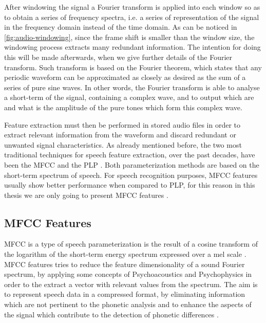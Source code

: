 After windowing the signal a Fourier transform is applied into each window so as to obtain
a series of frequency spectra, i.e. a series of representation of the signal in the frequency domain instead of the time domain. As can be noticed in \autoref{fig:audio-windowing}, since the frame shift is smaller than the window size, the windowing process extracts many redundant information. The intention for doing this will be made afterwards, when we give further details of the Fourier transform. Such transform is based on the Fourier theorem, which states that any periodic waveform can be approximated as closely as desired as the sum of a series of pure sine waves. In other words, the Fourier transform is able to analyse a short-term of the signal, containing a complex wave, and to output which are and what is the amplitude of the pure tones which form this complex wave.

Feature extraction must then be performed in stored audio files in order to extract relevant information from the waveform and discard redundant or unwanted signal characteristics. As already mentioned before, the two most traditional techniques for speech feature extraction, over the past decades, have been the \ac{MFCC} \cite{Davis1980} and the \ac{PLP} \cite{Hermansky1990}. Both parameterization methods are based on the short-term spectrum of speech. For speech recognition purposes, \ac{MFCC} features usually show better performance when compared to \ac{PLP}, for this reason in this thesis we are only going to present \ac{MFCC} features \cite{Muller2001, Mporas2007}.

\subsection{MFCC Features}

\ac{MFCC} is a type of speech parameterization is the result of a cosine transform of the logarithm of the short-term energy spectrum expressed over a mel scale \cite{Davis1980}. \ac{MFCC} features tries to reduce the feature dimensionality of a sound Fourier spectrum, by applying some concepts of Psychoacoustics and Psychophysics in order to the extract a vector with relevant values from the spectrum. The aim is to represent speech data in a compressed format, by eliminating information which are not pertinent to the phonetic analysis and to enhance the aspects of the signal which contribute to the detection of phonetic differences \cite{Davis1980}.

